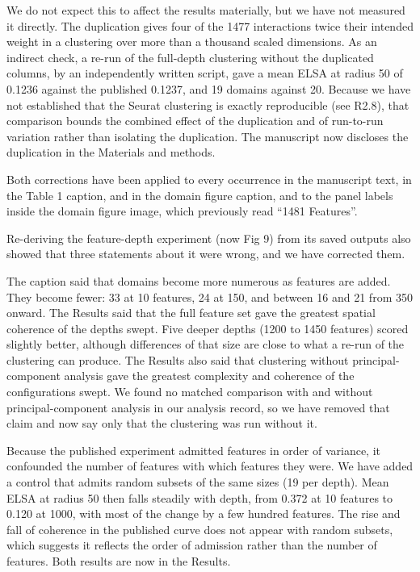 \documentclass[11pt]{article}
\begin{document}
We do not expect this to affect the results materially, but we have not measured it directly.
The duplication gives four of the 1477 interactions twice their intended weight in a clustering
over more than a thousand scaled dimensions. As an indirect check, a re-run of the full-depth
clustering without the duplicated columns, by an independently written script, gave a mean
ELSA at radius 50 of 0.1236 against the published 0.1237, and 19 domains against 20. Because
we have not established that the Seurat clustering is exactly reproducible (see R2.8), that
comparison bounds the combined effect of the duplication and of run-to-run variation rather
than isolating the duplication. The manuscript now discloses the duplication in the Materials
and methods.

Both corrections have been applied to every occurrence in the manuscript text, in the
Table 1 caption, and in the domain figure caption, and to the panel labels inside the domain
figure image, which previously read ``1481 Features''.

Re-deriving the feature-depth experiment (now Fig 9) from its saved outputs also showed that
three statements about it were wrong, and we have corrected them.

The caption said that domains become more numerous as features are added. They become fewer:
33 at 10 features, 24 at 150, and between 16 and 21 from 350 onward. The Results said that the
full feature set gave the greatest spatial coherence of the depths swept. Five deeper depths
(1200 to 1450 features) scored slightly better, although differences of that size are close to
what a re-run of the clustering can produce. The Results also said that clustering without
principal-component analysis gave the greatest complexity and coherence of the configurations
swept. We found no matched comparison with and without principal-component analysis in our
analysis record, so we have removed that claim and now say only that the clustering was run
without it.

Because the published experiment admitted features in order of variance, it confounded the
number of features with which features they were. We have added a control that admits random
subsets of the same sizes (19 per depth). Mean ELSA at radius 50 then falls steadily with
depth, from 0.372 at 10 features to 0.120 at 1000, with most of the change by a few hundred
features. The rise and fall of coherence in the published curve does not appear with random
subsets, which suggests it reflects the order of admission rather than the number of
features. Both results are now in the Results.
\end{document}
